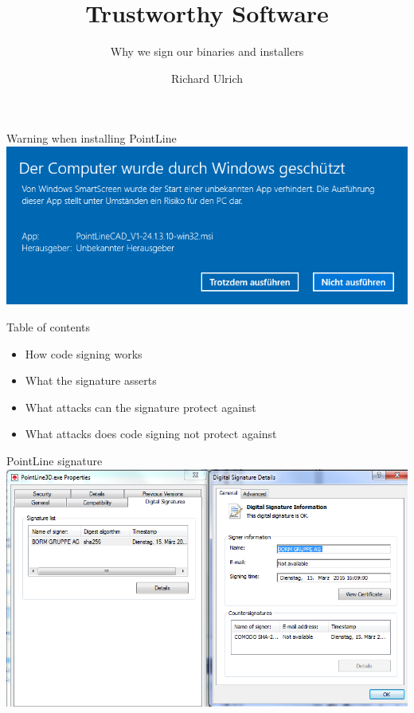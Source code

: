 \documentclass[11pt]{beamer}
\author{Richard Ulrich}
\title{Trustworthy Software}
\subtitle{Why we sign our binaries and installers}
\institute{BORM Informatik AG}
\begin{document}
\begin{frame}
\titlepage
\end{frame}


\begin{frame}{Warning when installing PointLine}
\includegraphics[scale=0.5]{obsolete_signature.png}
\end{frame}

\begin{frame}{Table of contents}
\begin{itemize}
\item How code signing works
\item What the signature asserts
\item What attacks can the signature protect against
\item What attacks does code signing not protect against
\end{itemize}
\end{frame}

\begin{frame}{PointLine signature}
\includegraphics[scale=0.38]{pointLine_signature.png}
\end{frame}
\end{document}
